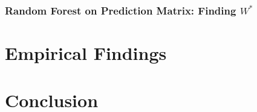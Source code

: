 \documentclass[12pt,letterpaper]{article}
\begin{document}
\subsubsection{Random Forest on Prediction Matrix: Finding $W^*$} %






\section{Empirical Findings}


% 

% 

\section{Conclusion}


\clearpage 
\end{document}
